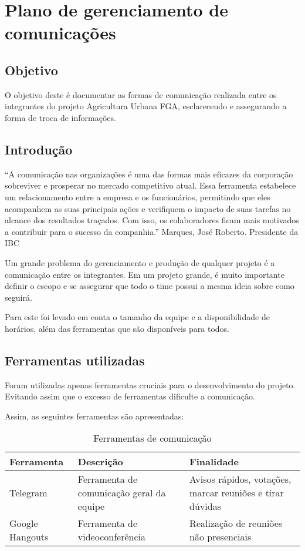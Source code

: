 \section{Plano de gerenciamento de comunicações}

\subsection{Objetivo}

  O objetivo deste é documentar as formas de comunicação realizada entre os integrantes do projeto Agricultura Urbana FGA, esclarecendo e
  assegurando a forma de troca de informações.

\subsection{Introdução}

  “A comunicação nas organizações é uma das formas mais eficazes da corporação sobreviver e prosperar no mercado competitivo atual.
  Essa ferramenta estabelece um relacionamento entre a empresa e os funcionários, permitindo que eles acompanhem as suas principais
  ações e verifiquem o impacto de suas tarefas no alcance dos resultados traçados. Com isso, os colaboradores ficam mais motivados a
  contribuir para o sucesso da companhia.” Marques, José Roberto. Presidente da IBC

  Um grande problema do gerenciamento e produção de qualquer projeto é a comunicação entre os integrantes. Em um projeto grande, é muito
  importante definir o escopo e se assegurar que todo o time possui a mesma ideia sobre como seguirá.

  Para este foi levado em conta o tamanho da equipe e a disponibilidade de horários, além das ferramentas que são disponíveis para todos.

\subsection{Ferramentas utilizadas}

  Foram utilizadas apenas ferramentas cruciais para o desenvolvimento do projeto. Evitando assim que o excesso de ferramentas dificulte
  a comunicação.

  Assim, as seguintes ferramentas são apresentadas:

  \begin{table}[!htb]
    \centering
    \begin{tabular}{p{}p{5cm}p{7cm}}
      \toprule
        \textbf{Ferramenta} & \textbf{Descrição} & \textbf{Finalidade} \\
      \midrule
        Telegram & Ferramenta de comunicação geral da equipe & Avisos rápidos, votações, marcar reuniões e tirar dúvidas \\ \midrule
        Google Hangouts & Ferramenta de videoconferência & Realização de reuniões não presenciais \\
      \bottomrule
    \end{tabular}
    \caption{Ferramentas de comunicação}
  \end{table}

